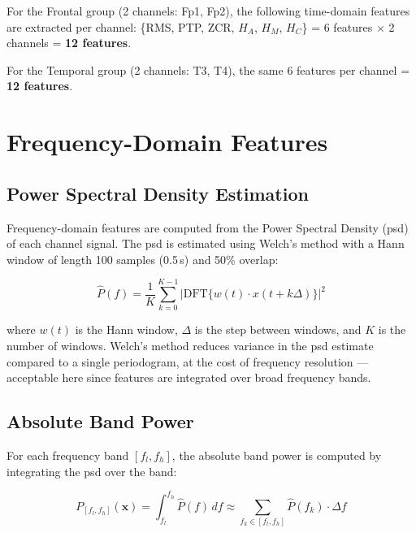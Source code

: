 For the Frontal group (2 channels: Fp1, Fp2), the following
time-domain features are extracted per channel:
\{RMS, PTP, ZCR, $H_A$, $H_M$, $H_C$\} = 6 features
$\times$ 2 channels = \textbf{12 features}.

For the Temporal group (2 channels: T3, T4), the same
6 features per channel = \textbf{12 features}.

\section{Frequency-Domain Features}
\label{sec:fe_freq}

\subsection{Power Spectral Density Estimation}

Frequency-domain features are computed from the Power
Spectral Density (\acrshort{psd}) of each channel signal.
The \acrshort{psd} is estimated using Welch's method with
a Hann window of length 100 samples (0.5\,s) and 50\%
overlap:

\begin{equation}
\hat{P}(f) = \frac{1}{K} \sum_{k=0}^{K-1}
\left|\text{DFT}\{w(t) \cdot x(t + k\Delta)\}\right|^2
\label{eq:welch}
\end{equation}

\noindent where $w(t)$ is the Hann window, $\Delta$ is the
step between windows, and $K$ is the number of windows.
Welch's method reduces variance in the \acrshort{psd}
estimate compared to a single periodogram, at the cost of
frequency resolution — acceptable here since features are
integrated over broad frequency bands.

\subsection{Absolute Band Power}

For each frequency band $[f_l, f_h]$, the absolute band
power is computed by integrating the \acrshort{psd} over
the band:

\begin{equation}
P_{[f_l, f_h]}(\mathbf{x}) =
\int_{f_l}^{f_h} \hat{P}(f)\, df
\approx \sum_{f_k \in [f_l, f_h]} \hat{P}(f_k) \cdot \Delta f
\label{eq:bandpower}
\end{equation}

